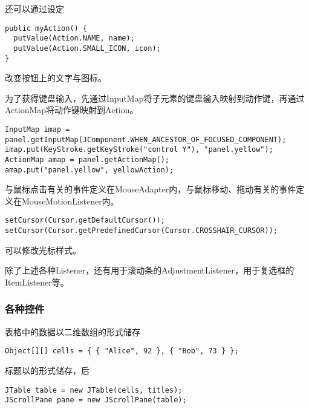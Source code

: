 \documentclass{ctexart}
\begin{document}
还可以通过设定
\begin{lstlisting}
public myAction() {
  putValue(Action.NAME, name);
  putValue(Action.SMALL_ICON, icon);
}
\end{lstlisting}
改变按钮上的文字与图标。
\par
为了获得键盘输入，先通过InputMap将子元素的键盘输入映射到动作键，再通过ActionMap将动作键映射到Action。
\begin{lstlisting}
InputMap imap = panel.getInputMap(JComponent.WHEN_ANCESTOR_OF_FOCUSED_COMPONENT);
imap.put(KeyStroke.getKeyStroke("control Y"), "panel.yellow");
ActionMap amap = panel.getActionMap();
amap.put("panel.yellow", yellowAction);
\end{lstlisting}
与鼠标点击有关的事件定义在MouseAdapter内，与鼠标移动、拖动有关的事件定义在MouseMotionListener内。
\begin{lstlisting}
setCursor(Cursor.getDefaultCursor());
setCursor(Cursor.getPredefinedCursor(Cursor.CROSSHAIR_CURSOR));
\end{lstlisting}
可以修改光标样式。
\par
除了上述各种Listener，还有用于滚动条的AdjustmentListener，用于复选框的ItemListener等。
\subsubsection*{各种控件}
表格中的数据以二维数组的形式储存
\begin{lstlisting}
Object[][] cells = { { "Alice", 92 }, { "Bob", 73 } };
\end{lstlisting}
标题以的形式储存，后
\begin{lstlisting}
JTable table = new JTable(cells, titles);
JScrollPane pane = new JScrollPane(table);
\end{lstlisting}
\end{document}
